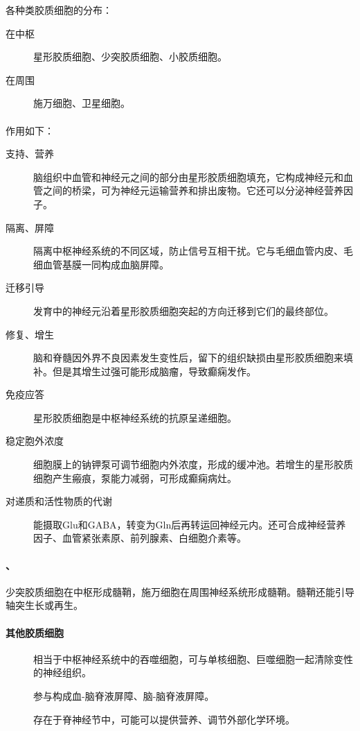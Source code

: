 各种类胶质细胞的分布：
\begin{description}
	\item[在中枢] 星形胶质细胞、少突胶质细胞、小胶质细胞。
	\item[在周围] 施万细胞、卫星细胞。
\end{description}

\paragraph{}

作用如下：
\begin{description}
	\item[支持、营养] 脑组织中血管和神经元之间的部分由星形胶质细胞填充，它构成神经元和血管之间的桥梁，可为神经元运输营养和排出废物。它还可以分泌神经营养因子。
	\item[隔离、屏障] 隔离中枢神经系统的不同区域，防止信号互相干扰。它与毛细血管内皮、毛细血管基膜一同构成血脑屏障。
	\item[迁移引导] 发育中的神经元沿着星形胶质细胞突起的方向迁移到它们的最终部位。
	\item[修复、增生] 脑和脊髓因外界不良因素发生变性后，留下的组织缺损由星形胶质细胞来填补。但是其增生过强可能形成脑瘤，导致癫痫发作。
	\item[免疫应答] 星形胶质细胞是中枢神经系统的抗原呈递细胞。
	\item[稳定胞外浓度] 细胞膜上的钠钾泵可调节细胞内外浓度，形成的缓冲池。若增生的星形胶质细胞产生瘢痕，泵能力减弱，可形成癫痫病灶。
	\item[对递质和活性物质的代谢] 能摄取Glu和GABA，转变为Gln后再转运回神经元内。还可合成神经营养因子、血管紧张素原、前列腺素、白细胞介素等。
\end{description}

\paragraph{、}

少突胶质细胞在中枢形成髓鞘，施万细胞在周围神经系统形成髓鞘。髓鞘还能引导轴突生长或再生。

\paragraph{其他胶质细胞}

\begin{description}
	\item[] 相当于中枢神经系统中的吞噬细胞，可与单核细胞、巨噬细胞一起清除变性的神经组织。
	\item[] 参与构成血-脑脊液屏障、脑-脑脊液屏障。
	\item[] 存在于脊神经节中，可能可以提供营养、调节外部化学环境。
\end{description}


